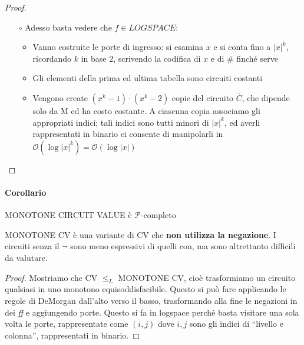 \documentclass[a4paper,10pt,oneside]{article}
\theoremstyle{break}
\newcommand{\bigo}{\mathcal O}
\begin{document}
\begin{mdframed}
\begin{proof}
\begin{itemize}
\begin{enumerate}
  \item[$\circ$] Adesso basta vedere che $f \in LOGSPACE$:
  \begin{itemize}
   \item Vanno costruite le porte di ingresso: si esamina $x$ e si conta fino a $|x|^k$, ricordando $k$ in base 2, scrivendo la codifica di $x$ e di \# finché serve
   \item Gli elementi della prima ed ultima tabella sono circuiti costanti
   \item Vengono create $(x^k - 1) \cdot (x^k - 2)$ copie del circuito $\overline C$, che dipende solo da M ed ha costo costante. A ciascuna copia associamo gli appropriati indici; tali indici sono tutti minori di $|x|^k$, ed averli rappresentati in binario ci consente di manipolarli in $\bigo (\log |x|^k) = \bigo (\log |x|)$
  \end{itemize}

 \end{enumerate}

\end{itemize}

\end{proof}

\dotfill

\paragraph{Corollario} MONOTONE CIRCUIT VALUE è  $\mathcal P$-completo\smallskip

\dotfill\smallskip

MONOTONE CV è una variante di CV che \textbf{non utilizza la negazione}. I circuiti senza il $\neg$ sono meno espressivi di quelli con, ma sono altrettanto difficili da valutare.

\dotfill

\begin{proof}
 Mostriamo che CV $\leq_L$ MONOTONE CV, cioè trasformiamo un circuito qualsiasi in uno monotono equisoddisfacibile. Questo si può fare applicando le regole di DeMorgan dall'alto verso il basso, trasformando alla fine le negazioni in dei \emph{ff} e aggiungendo porte. Questo si fa in logspace perché basta visitare una sola volta le porte, rappresentate come $(i, j)$ dove $i, j$ sono gli indici di ``livello e colonna'', rappresentati in binario.
\end{proof}
\end{mdframed}

\newpage
\end{document}
